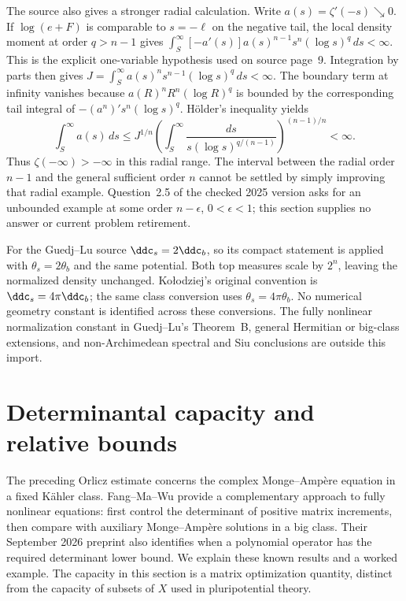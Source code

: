 The source also gives a stronger radial calculation. Write
$a(s)=\zeta'(-s)\searrow0$. If $\log(e+F)$ is comparable to
$s=-\ell$ on the negative tail, the local density moment at order
$q>n-1$ gives
$\int_S^{\infty}[-a'(s)]a(s)^{n-1}s^n(\log s)^q\,ds<\infty$.
This is the explicit one-variable hypothesis used on source page~9.
Integration by parts then gives
$J=\int_S^{\infty}a(s)^ns^{n-1}(\log s)^q\,ds<\infty$.
The boundary term at infinity vanishes because
$a(R)^nR^n(\log R)^q$ is bounded by the corresponding tail integral
of $-(a^n)'s^n(\log s)^q$. H\"older's inequality yields
\[
\tag{68.23ad}\label{eq:ytd-orlicz-radial-holder}
 \int_S^{\infty}a(s)\,ds
   \leq J^{1/n}
     \left(\int_S^{\infty}
          \frac{ds}{s(\log s)^{q/(n-1)}}\right)^{(n-1)/n}
   <\infty.
\]
Thus $\zeta(-\infty)>-\infty$ in this radial range. The interval
between the radial order $n-1$ and the general sufficient order $n$
cannot be settled by simply improving that radial example.
Question~2.5 of the checked 2025 version asks for an unbounded example
at some order $n-\epsilon$, $0<\epsilon<1$; this section supplies no
answer or current problem retirement.

For the Guedj--Lu source $\ddc_s=2\ddc_b$, so its compact statement
is applied with $\theta_s=2\theta_b$ and the same potential. Both
top measures scale by $2^n$, leaving the normalized density unchanged.
Ko\l odziej's original convention is $\ddc_s=4\pi\ddc_b$; the
same class conversion uses $\theta_s=4\pi\theta_b$.
No numerical geometry constant is identified across these conversions.
The fully nonlinear normalization constant in Guedj--Lu's Theorem~B,
general Hermitian or big-class extensions, and non-Archimedean spectral
and Siu conclusions are outside this import.

\section{Determinantal capacity and relative bounds}
\label{sec:ytd-determinantal-capacity}

The preceding Orlicz estimate concerns the complex Monge--Amp\`ere
equation in a fixed K\"ahler class. Fang--Ma--Wu
\cite{FangMaWu26DeterminantalV1} provide a complementary approach to
fully nonlinear equations: first control the determinant of positive
matrix increments, then compare with auxiliary Monge--Amp\`ere
solutions in a big class. Their September 2026 preprint also identifies
when a polynomial operator has the required determinant lower bound.
We explain these known results and a worked example. The capacity in
this section is a matrix optimization quantity, distinct from the
capacity of subsets of $X$ used in pluripotential theory.

